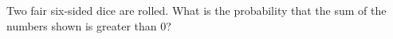 Two fair six-sided dice are rolled. What is the probability that the sum of the numbers shown is greater than $0$?

